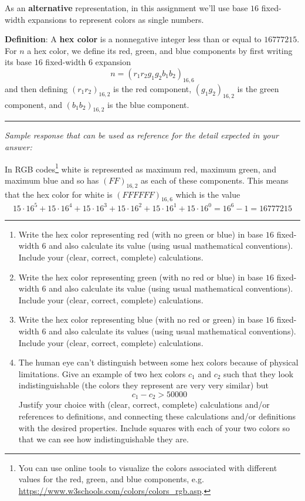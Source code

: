 \begin{enumerate}
    As an {\bf alternative} representation, in this assignment
    we'll use base $16$ fixed-width expansions to represent colors
    as single numbers.
    
    {\bf Definition}: A {\bf hex color} is a nonnegative
    integer less than or equal to $16777215$. 
    For $n$ a hex color, we define its red, green, and blue components
    by first writing its base $16$ fixed-width $6$ expansion
    $$n = (r_1r_2g_1g_2b_1b_2)_{16,6}$$ and 
    then defining
    $(r_1r_2)_{16,2}$ is the red
    component, $(g_1g_2)_{16,2}$ is the green component, and $(b_1b_2)_{16,2}$ is the
    blue component.
    
    \newpage
    \rule{0.5\textwidth}{.4pt}

    {\it Sample response that can be used as reference for the detail expected 
    in your answer:} 
    
    In RGB codes\footnote{You can use online tools to visualize the colors associated
    with different values for the red, green, and blue components, 
    e.g. \url{https://www.w3schools.com/colors/colors_rgb.asp}. }
    white is represented as maximum red, maximum green, and maximum blue 
    and so has
    $(FF)_{16,2}$ as each of these components. This means that the hex color for white
    is $(FFFFFF)_{16,6}$ which is the value 
    \[
        15\cdot 16^5 + 15 \cdot 16^4 + 15 \cdot 16^3 + 15 \cdot 16^2 + 15 \cdot 16^1 + 15 \cdot 16^0 
        = 16^6 - 1 = 16777215
    \]
    \rule{0.5\textwidth}{.4pt}

    \begin{enumerate}
    \item  Write the hex color representing red (with no green or blue) 
    in base $16$ fixed-width $6$ and also calculate its value 
    (using usual mathematical conventions).
    Include your (clear, correct, complete) calculations.
    \item  Write the hex color representing green (with no red or blue) 
    in base $16$ fixed-width $6$ and also calculate its value
    (using usual mathematical conventions).
    Include your (clear, correct, complete) calculations.
    \item  Write the hex color representing blue (with no red or green) 
    in base $16$ fixed-width $6$ and also calculate its values
    (using usual mathematical conventions).
    Include your (clear, correct, complete) calculations.
    \item The human eye can't distinguish between some hex colors because of 
    physical limitations. Give an example of two hex colors $c_1$ and $c_2$ such that
    they look indistinguishable (the colors they represent are very very similar) but
        \[
            c_1 - c_2 > 50000
        \]
    Justify your choice 
    with (clear, correct, complete) calculations and/or references to definitions, 
    and connecting these
    calculations and/or definitions with
    the desired properties.  Include squares with each of your two colors so 
    that we can see how indistinguishable they are. 


\end{enumerate}
\end{enumerate}
